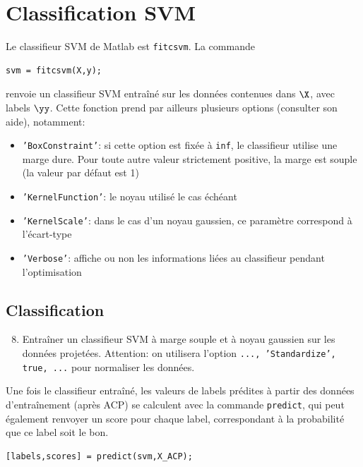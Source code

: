 \section{Classification SVM}

Le classifieur SVM de Matlab est \texttt{fitcsvm}. La commande
\begin{lstlisting}
svm = fitcsvm(X,y);
\end{lstlisting}
renvoie un classifieur SVM entraîné sur les données contenues dans $\X$, avec labels $\yy$. Cette fonction prend par ailleurs plusieurs options (consulter son aide), notamment:
\begin{itemize}[label=-]
	\item \texttt{'BoxConstraint'}: si cette option est fixée à \texttt{inf}, le classifieur utilise une marge dure. Pour toute autre valeur strictement positive, la marge est souple (la valeur par défaut est 1)
	\item \texttt{'KernelFunction'}: le noyau utilisé le cas échéant
	\item \texttt{'KernelScale'}: dans le cas d'un noyau gaussien, ce paramètre correspond à l'écart-type
	\item \texttt{'Verbose'}: affiche ou non les informations liées au classifieur pendant l'optimisation
\end{itemize}

\subsection{Classification}

\begin{enumerate}
	\setcounter{enumi}{7}
	\item Entraîner un classifieur SVM à marge souple et à noyau gaussien sur les données projetées. Attention: on utilisera l'option \texttt{..., 'Standardize', true, ...} pour normaliser les données.
\end{enumerate}

Une fois le classifieur entraîné, les valeurs de labels prédites à partir des données d'entraînement (après ACP) se calculent avec la commande \texttt{predict}, qui peut également renvoyer un score pour chaque label, correspondant à la probabilité que ce label soit le bon.
\begin{lstlisting}
[labels,scores] = predict(svm,X_ACP);
\end{lstlisting}

